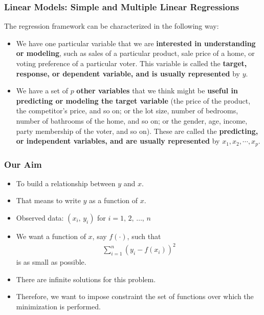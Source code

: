 \documentclass[10pt]{beamer} %
\begin{document}
\begin{frame}
	\frametitle{Linear Models: Simple and Multiple Linear Regressions}
	
	The regression framework can be characterized in the following way: %
	\begin{itemize}
		\item We have one particular variable that we are\textbf{ interested in understanding or modeling}, such as sales of a particular product, sale price of a home, or 	voting preference of a particular voter. This variable is called the \textbf{target, response, or dependent variable, and is usually represented} by $y$.
		
		\item We have a set of $p$ \textbf{other variables} that we think might be\textbf{ useful in predicting or modeling the target variable} (the price of the product, the competitor's price, and so on; or the lot size, number of bedrooms, number of bathrooms of the home, and so on; or the gender, age, income, party membership of the voter, and so on). These are called the \textbf{predicting, or independent variables, and are usually represented} by $x_1, x_2, \cdots, x_p$.
		
\end{itemize}	
	
\end{frame}

\begin{frame}
   \frametitle{Our Aim}
   \begin{itemize}
      \item To build a relationship between $y$ and $x$.
      \item That means to write $y$ as a function of $x$.
      \item Observed data: $(x_i,\,y_i)$ for $i=1,\,2,\,\ldots,\,n$
      \item We want a function of $x$, say $f(\cdot)$, such that
         \begin{align*}
            \sum_{i=1}^{n} \left( y_i - f(x_i) \right)^2
         \end{align*}
         is as small as possible.
      \item There are infinite solutions for this problem.
      \item Therefore, we want to impose constraint the set of functions over
         which the minimization is performed.
   \end{itemize}
\end{frame}
\end{document}
